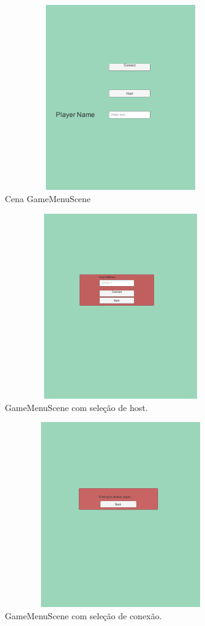 \begin{figure}[!h]
    \includegraphics[width=10cm, height=8cm]{screen2.png}
    \centering
    \caption{Cena GameMenuScene}
    \label{fig:screen2}
\end{figure}

\begin{figure}[!h]
    \includegraphics[width=10cm, height=8cm]{screen3.png}
    \centering
    \caption{GameMenuScene com seleção de host.}
    \label{fig:screen3}
\end{figure}

\begin{figure}[!h]
    \includegraphics[width=10cm, height=8cm]{screen4.png}
    \centering
    \caption{GameMenuScene com seleção de conexão.}
    \label{fig:screen4}
\end{figure}
    
